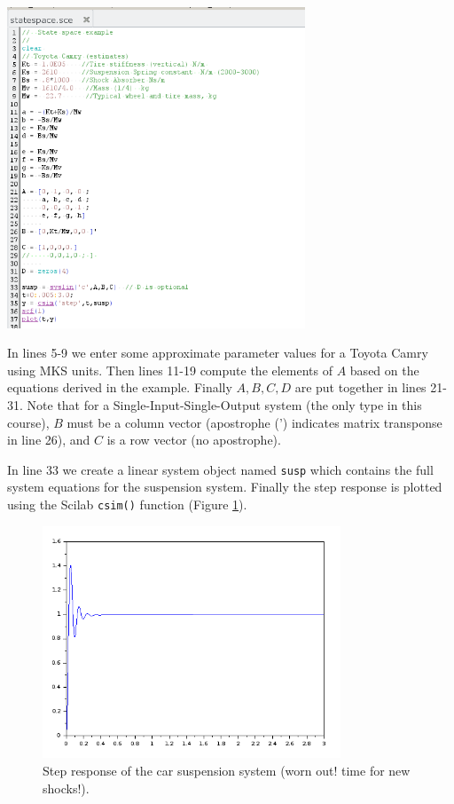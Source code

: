 \begin{center}
\includegraphics[width=3.5in]{figs04/ss_script.png}
\end{center}

In lines 5-9 we enter some approximate parameter values for a Toyota Camry using MKS units.  Then lines 11-19 compute the elements of $A$ based on the equations derived in the example.  Finally $A,B,C,D$ are put together in lines 21-31.   Note that for a Single-Input-Single-Output system (the only type in this course), $B$ must be a column vector (apostrophe (') indicates matrix transponse in line 26), and $C$ is a row vector (no apostrophe).  

In line 33 we create a linear system object named {\tt susp} which contains the full system equations for the suspension system.  Finally the step response is plotted using the Scilab {\tt csim()} function 
(Figure \ref{graphsuspensionstep}).

\begin{figure}\centering
\includegraphics[width=3.5in]{figs04/ss_stepresp.png}
\caption{Step response of the car suspension system (worn out! time for new shocks!).}\label{graphsuspensionstep}
\end{figure}


